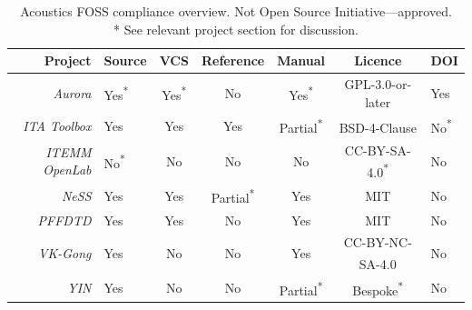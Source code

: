 \begin{table}
	\centering
	\begin{tabular}{rlccccl}
		\toprule
		\textbf{Project}                             & \textbf{Source}            & \textbf{VCS}
		                                             & \textbf{Reference}         & \textbf{Manual}            &
		\textbf{Licence}                             & \textbf{DOI}
		\\\hline
		\textit{Aurora}                              & Yes\textsuperscript{*}     & Yes\textsuperscript{*}
		                                             & No                         & Yes\textsuperscript{*}     &
		GPL-3.0-or-later                             & Yes                                                           \\
		\textit{ITA Toolbox}                         & Yes                        & Yes
		                                             & Yes                        & Partial\textsuperscript{*} &
		BSD-4-Clause\textsuperscript{\textdagger}    & No\textsuperscript{*}                                         \\
		\textit{ITEMM OpenLab}                       & No\textsuperscript{*}      & No
		                                             & No                         & No                         &
		CC-BY-SA-4.0\textsuperscript{*\textdagger}   & No                                                            \\
		\textit{NeSS}                                & Yes                        & Yes
		                                             & Partial\textsuperscript{*} & Yes                        & MIT
		                                             & No                                                            \\
		\textit{PFFDTD}                              & Yes                        & Yes
		                                             & No                         & Yes                        & MIT
		                                             & No                                                            \\
		\textit{VK-Gong}                             & Yes                        & No
		                                             & No                         & Yes                        &
		CC-BY-NC-SA-4.0\textsuperscript{\textdagger} & No                                                            \\
		\textit{YIN}                                 & Yes                        & No
		                                             & No                         & Partial\textsuperscript{*} &
		Bespoke\textsuperscript{*\textdagger}        & No                                                            \\
		\bottomrule
	\end{tabular}
	\caption[Acoustics FOSS compliance overview]{Acoustics FOSS compliance overview. \textdagger Not Open Source Initiative---approved. \\ * See relevant project section for discussion.}
	\label{tab:foss-compliance}
\end{table}
\raggedbottom

